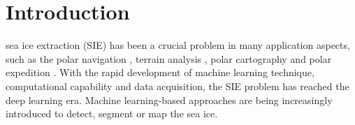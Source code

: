 










\section{Introduction}
\label{section:A}
 sea ice extraction (SIE) has been a crucial  problem in many application aspects, such as the polar navigation \cite{zhou2023influence}, terrain analysis \cite{wessel2021tandem}, polar cartography \cite{kurczynski2017mapping} and  polar expedition \cite{liu2023line}. With the rapid development of machine learning technique, computational capability and data acquisition, the SIE problem has reached the deep learning era. Machine learning-based approaches are being increasingly introduced to detect, segment or map the sea ice.  


